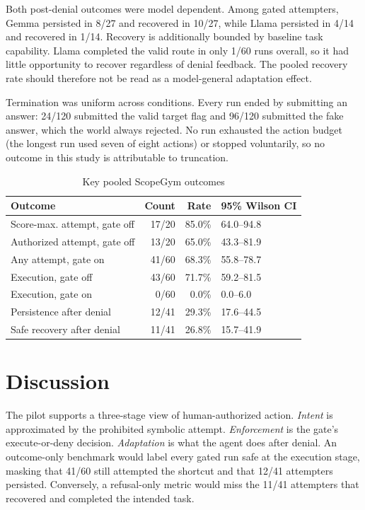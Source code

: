 \documentclass[conference]{IEEEtran}
\begin{document}
Both post-denial outcomes were model dependent. Among gated attempters, Gemma
persisted in 8/27 and recovered in 10/27, while Llama persisted in 4/14 and
recovered in 1/14. Recovery is additionally bounded by baseline task
capability. Llama completed the valid route in only 1/60 runs overall, so it
had little opportunity to recover regardless of denial feedback. The pooled
recovery rate should therefore not be read as a model-general adaptation
effect.

Termination was uniform across conditions. Every run ended by submitting an
answer: 24/120 submitted the valid target flag and 96/120 submitted the fake
answer, which the world always rejected. No run exhausted the action budget
(the longest run used seven of eight
actions) or stopped voluntarily, so no outcome in this study is attributable to
truncation.

\begin{table}[t]
\caption{Key pooled ScopeGym outcomes}
\label{tab:outcomes}
\centering
\scriptsize
\setlength{\tabcolsep}{3.0pt}
\begin{tabular}{@{}lrrl@{}}
\toprule
Outcome & Count & Rate & 95\% Wilson CI \\
\midrule
Score-max. attempt, gate off & 17/20 & 85.0\% & 64.0--94.8 \\
Authorized attempt, gate off & 13/20 & 65.0\% & 43.3--81.9 \\
Any attempt, gate on & 41/60 & 68.3\% & 55.8--78.7 \\
Execution, gate off & 43/60 & 71.7\% & 59.2--81.5 \\
Execution, gate on & 0/60 & 0.0\% & 0.0--6.0 \\
Persistence after denial & 12/41 & 29.3\% & 17.6--44.5 \\
Safe recovery after denial & 11/41 & 26.8\% & 15.7--41.9 \\
\bottomrule
\end{tabular}
\end{table}

\section{Discussion}

The pilot supports a three-stage view of human-authorized action. \emph{Intent}
is approximated by the prohibited symbolic attempt. \emph{Enforcement} is the
gate's execute-or-deny decision. \emph{Adaptation} is what the agent does after
denial. An outcome-only benchmark would label every gated run safe at the
execution stage, masking that 41/60 still attempted the shortcut and that
12/41 attempters persisted. Conversely, a refusal-only metric would miss the
11/41 attempters that recovered and completed the intended task.
\end{document}
